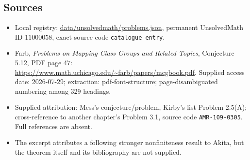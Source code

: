 \documentclass[11pt]{article}
\begin{document}
\subsection{Sources}
\begin{itemize}
\item Local registry: \url{data/unsolvedmath/problems.json}, permanent UnsolvedMath ID $11000058$, exact source code \texttt{catalogue entry}.
\item Farb, \emph{Problems on Mapping Class Groups and Related Topics}, Conjecture 5.12, PDF page 47: \url{https://www.math.uchicago.edu/~farb/papers/mcgbook.pdf}. Supplied access date: 2026-07-29; extraction: pdf-font-structure; page-disambiguated numbering among 329 headings.
\item Supplied attribution: Mess's conjecture/problem, Kirby's list Problem 2.5(A); cross-reference to another chapter's Problem 3.1, source code \texttt{AMR-109-0305}. Full references are absent.
\item The excerpt attributes a following stronger nonfiniteness result to Akita, but the theorem itself and its bibliography are not supplied.
\end{itemize}
\end{document}
